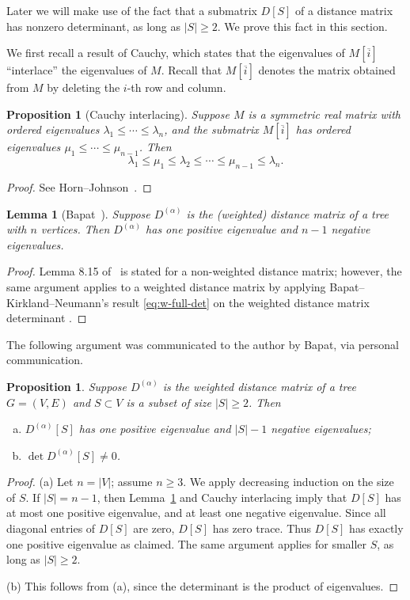 \documentclass{amsart}
\newtheorem{prop}[thm]{Proposition}
\newtheorem{lem}[thm]{Lemma}
\theoremstyle{definition}
\newcommand{\Da}{{D^{(\alpha)}}}
\begin{document}
Later we will make use of the fact that a submatrix $D[S]$ of a distance matrix has nonzero determinant, as long as $|S| \geq 2$.
We prove this fact in this section.

We first recall a result of Cauchy, which states that the eigenvalues of $M[\overline{i}]$ ``interlace'' the eigenvalues of $M$.
Recall that $M[\overline{i}]$ denotes the matrix obtained from $M$ by deleting the $i$-th row and column.

\begin{prop}[Cauchy interlacing]
\label{prop:cauchy-interlacing}
Suppose $M$ is a symmetric real matrix 
with ordered eigenvalues $\lambda_1 \leq \cdots \leq \lambda_n$, 
and  the submatrix $M[\overline{i}]$ has ordered eigenvalues $\mu_1 \leq \cdots \leq \mu_{n-1}$.
Then
\[
	\lambda_1 \leq \mu_1 \leq \lambda_2 \leq \cdots \leq \mu_{n-1} \leq \lambda_n.
\]
\end{prop}
\begin{proof}
See Horn--Johnson~\cite[Theorem 4.3.17]{horn-johnson}.
\end{proof}

\begin{lem}[{Bapat~\cite[Lemma 8.15]{bapat}}]
\label{lem:dist-signature}
Suppose $\Da$ is the (weighted) distance matrix of a tree with $n$ vertices. 
Then $\Da$ has one positive eigenvalue and $n - 1$ negative eigenvalues.
\end{lem}
\begin{proof}
Lemma 8.15 of~\cite{bapat} is stated for a non-weighted distance matrix;
however, the same argument applies to a weighted distance matrix by applying Bapat--Kirkland--Neumann's result \eqref{eq:w-full-det} on the weighted distance matrix determinant \cite[Corollary 2.5]{bapat-kirkland-neumann}. 
\end{proof}

The following argument was communicated to the author by Bapat, via personal communication.
\begin{prop}
\label{prop:distance-sub-nonsingular}
Suppose $\Da$ is the weighted distance matrix of a tree $G = (V,E)$ and $S \subset V$ is a subset of size $|S| \geq 2$. 
Then
\begin{enumerate}[(a)]
\item $\Da[S]$ has one positive eigenvalue and $|S| - 1$ negative eigenvalues;

\item $\det \Da[S] \neq 0$.

\end{enumerate}
\end{prop}
\begin{proof}
(a) Let $n = |V|$; assume $n \geq 3$.
We apply decreasing induction on the size of $S$. 
If $|S| = n - 1$, then Lemma~\ref{lem:dist-signature} and Cauchy interlacing imply that $D[S]$ has at most one positive eigenvalue, and at least one negative eigenvalue. 
Since all diagonal entries of $D[S]$ are zero, $D[S]$ has zero trace. 
Thus $D[S]$ has exactly one positive eigenvalue as claimed.
The same argument applies for smaller $S$, as long as $|S| \geq 2$.

(b) This follows from (a), since the determinant is the product of eigenvalues.
\end{proof}
\end{document}
